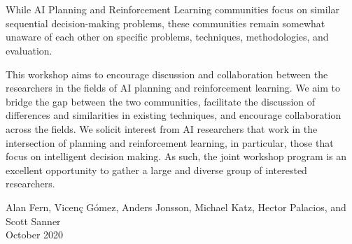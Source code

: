 \section*{}

While AI Planning and Reinforcement Learning communities focus on similar
sequential decision-making problems, these communities remain somewhat unaware
of each other on specific problems, techniques, methodologies, and evaluation.

This workshop aims to encourage discussion and collaboration between the
researchers in the fields of AI planning and reinforcement learning. We aim to
bridge the gap between the two communities, facilitate the discussion of
differences and similarities in existing techniques, and encourage collaboration
across the fields. We solicit interest from AI researchers that work in the
intersection of planning and reinforcement learning, in particular, those that
focus on intelligent decision making. As such, the joint workshop program is an
excellent opportunity to gather a large and diverse group of interested
researchers.

\bigskip
\begin{flushright}
Alan Fern, Vicen\c{c} G\'{o}mez, Anders Jonsson, Michael Katz, Hector Palacios, and Scott Sanner
\\
October 2020
\end{flushright}
